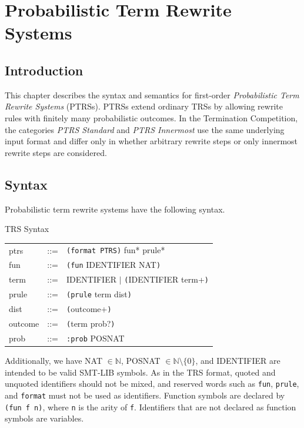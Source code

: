 \newcommand{\xliftto}[1]{\mathrel{\smash{\stackrel{\raisebox{3.4pt}{\tiny $#1\:$}}{\smash{\liftto}}}}}
\newcommand{\xleftliftto}[1]{\mathrel{\smash{\stackrel{\raisebox{3.4pt}{\tiny $\:#1$}}{\smash{\leftliftto}}}}}
\newcommand{\liftto}{\rightrightarrows}
\newcommand{\iliftto}{\xliftto{\mathbf{i}}}

\chapter{Probabilistic Term Rewrite Systems}

\section{Introduction}

This chapter describes the syntax and semantics for first-order \emph{Probabilistic Term Rewrite Systems} (PTRSs).
PTRSs extend ordinary TRSs by allowing rewrite rules with finitely many probabilistic outcomes.
In the Termination Competition, the categories \emph{PTRS Standard} and \emph{PTRS Innermost}
use the same underlying input format and differ only in whether arbitrary rewrite steps or only innermost rewrite steps are considered.

\section{Syntax}

Probabilistic term rewrite systems have the following syntax.

\begin{grammar}{TRS Syntax}
  \begin{tabular}{lll}
  ptrs & ::= & \texttt{(format PTRS)} fun* prule* \\
  fun & ::= & \texttt{(fun} IDENTIFIER NAT\texttt{)} \\
  term & ::= & IDENTIFIER $|$ \texttt{(}IDENTIFIER term+\texttt{)} \\
  prule & ::= & \texttt{(prule} term dist\texttt{)} \\
  dist & ::= & \texttt{(}outcome+\texttt{)} \\
  outcome & ::= & \texttt{(}term prob?\texttt{)} \\
  prob & ::= & \texttt{:prob} POSNAT \\
  \end{tabular}
\end{grammar}

\bigskip
Additionally, we have NAT $\in \mathbb{N}$, POSNAT $\in \mathbb{N} \setminus \{0\}$, and IDENTIFIER are intended to be valid SMT-LIB symbols.
As in the TRS format, quoted and unquoted identifiers should not be mixed, and reserved words such as
\texttt{fun}, \texttt{prule}, and \texttt{format} must not be used as identifiers.
Function symbols are declared by \texttt{(fun f n)}, where \texttt{n} is the arity of \texttt{f}.
Identifiers that are not declared as function symbols are variables.

